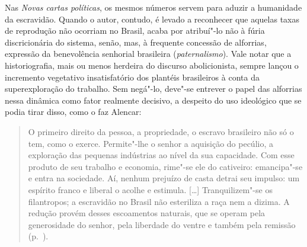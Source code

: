Nas \textit{Novas cartas políticas}, os mesmos números servem para
aduzir a humanidade da escravidão. Quando o autor, contudo, é levado a reconhecer
que aquelas taxas de reprodução não ocorriam no Brasil, acaba por 
atribuí"-lo não à fúria discricionária do sistema, 
senão, mas, à  frequente concessão de alforrias, expressão da benevolência 
senhorial brasileira (\textit{paternalismo}). Vale notar
que a historiografia, mais ou menos herdeira do discurso abolicionista,
sempre lançou o incremento vegetativo insatisfatório dos plantéis
brasileiros à  conta da superexploração do trabalho. Sem negá"-lo,
deve"-se entrever o papel das alforrias nessa dinâmica como fator
realmente decisivo, a despeito do uso ideológico que se podia tirar
disso, como o faz Alencar: 

\begin{quote}
O primeiro direito da pessoa, a propriedade, o escravo brasileiro não
só o tem, como o exerce. Permite"-lhe o senhor a aquisição do pecúlio,
a exploração das pequenas indústrias ao nível da sua capacidade. Com
esse produto de seu trabalho e economia, rime"-se ele do cativeiro:
emancipa"-se e entra na sociedade. Aí, nenhum prejuízo de casta detrai
seu impulso: um espírito franco e liberal o acolhe e estimula.
[\ldots{}]
Tranquilizem"-se os filantropos; a escravidão no Brasil não esteriliza
a raça nem a dizima. A redução provém desses escoamentos naturais, que
se operam pela generosidade do senhor, pela liberdade do ventre e
também pela remissão (p.~\pageref{filantropo}). 
\end{quote}

